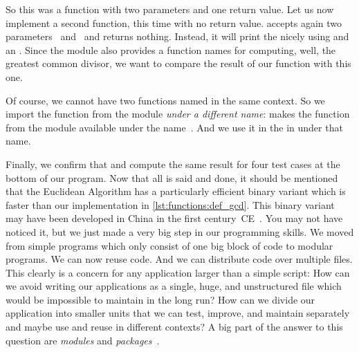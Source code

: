 So this was a function with two parameters and one return value.
Let us now implement a second function, this time with no return value.
 accepts again two parameters~ and~ and returns nothing.
Instead, it will print the  nicely using  and an .
Since the  module also provides a function names  for computing, well, the greatest common divisor, we want to compare the result of our function with this one.%
%
\begin{sloppypar}%
Of course, we cannot have two functions named  in the same context.
So we import the function from the  module \emph{under a different name}:
 makes the  function from the module  available under the name~.
And we use it in the  in  under that name.%
\end{sloppypar}%
%
Finally, we confirm that  and  compute the same result for four test cases at the bottom of our program.
Now that all is said and done, it should be mentioned that the Euclidean Algorithm has a particularly efficient binary variant which is faster than our implementation in \cref{lst:functions:def_gcd}.
This binary variant may have been developed in China in the first century~CE~\cite{B1999FAOTBEA}.%
%
\FloatBarrier%
\endhsection%
%
%
%
%
%
You may not have noticed it, but we just made a very big step in our programming skills.
We moved from simple programs which only consist of one big block of code to modular programs.
We can now reuse code.
And we can distribute code over multiple files.
This clearly is a concern for any application larger than a simple script:
How can we avoid writing our applications as a single, huge, and unstructured file which would be impossible to maintain in the long run?
How can we divide our application into smaller units that we can test, improve, and maintain separately and maybe use and reuse in different contexts?
A big part of the answer to this question are \emph{modules} and \emph{packages}~\cite{PSF2024TIS}.


